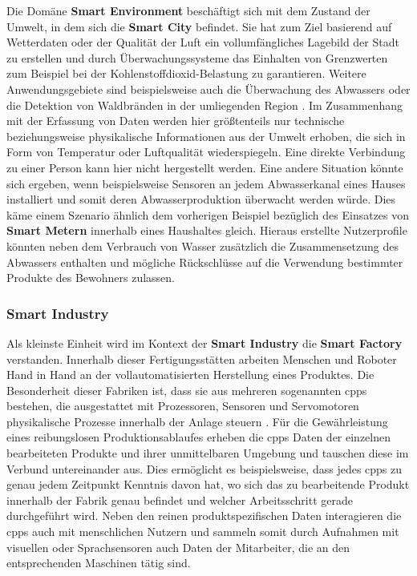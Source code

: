 Die Domäne \textbf{Smart Environment} beschäftigt sich mit dem Zustand der Umwelt, in dem sich die \textbf{Smart City} befindet. Sie hat zum Ziel basierend auf Wetterdaten oder der Qualität der Luft ein vollumfängliches Lagebild der Stadt zu erstellen und durch Überwachungssysteme das Einhalten von Grenzwerten zum Beispiel bei der Kohlenstoffdioxid-Belastung zu garantieren. 
Weitere Anwendungsgebiete sind beispielsweise auch die Überwachung des Abwassers oder die Detektion von Waldbränden in der umliegenden Region \cite{SecPrivSmartCity2021}. Im Zusammenhang mit der Erfassung von Daten werden hier größtenteils nur technische beziehungsweise physikalische Informationen aus der Umwelt erhoben, die sich in Form von Temperatur oder Luftqualität wiederspiegeln. 
Eine direkte Verbindung zu einer Person kann hier nicht hergestellt werden. Eine andere Situation könnte sich ergeben, wenn beispielsweise Sensoren an jedem Abwasserkanal eines Hauses installiert und somit deren Abwasserproduktion überwacht werden würde. 
Dies käme einem Szenario ähnlich dem vorherigen Beispiel bezüglich des Einsatzes von \textbf{Smart Metern} innerhalb eines Haushaltes gleich. Hieraus erstellte Nutzerprofile könnten neben dem Verbrauch von Wasser zusätzlich die Zusammensetzung des Abwassers enthalten und mögliche Rückschlüsse auf die Verwendung bestimmter Produkte des Bewohners zulassen.

\subsubsection{Smart Industry}
\label{sec:Analyse der Datenerhebung:ssec:Smart City:sssec:Smart Industry}

Als kleinste Einheit wird im Kontext der \textbf{Smart Industry} die \textbf{Smart Factory} verstanden. Innerhalb dieser Fertigungsstätten arbeiten Menschen und Roboter Hand in Hand an der vollautomatisierten Herstellung eines Produktes. Die Besonderheit dieser Fabriken ist, dass sie aus mehreren sogenannten \ac{cpps} bestehen, die ausgestattet mit Prozessoren, Sensoren und Servomotoren physikalische Prozesse innerhalb der Anlage steuern \cite{Sadeghi2015}. Für die Gewährleistung eines reibungslosen Produktionsablaufes erheben die \ac{cpps} Daten der einzelnen bearbeiteten Produkte und ihrer unmittelbaren Umgebung und tauschen diese im Verbund untereinander aus. Dies ermöglicht es beispielsweise, dass jedes \ac{cpps} zu genau jedem Zeitpunkt Kenntnis davon hat, wo sich das zu bearbeitende Produkt innerhalb der Fabrik genau befindet und welcher Arbeitsschritt gerade durchgeführt wird. Neben den reinen produktspezifischen Daten interagieren die \ac{cpps} auch mit menschlichen Nutzern und sammeln somit durch Aufnahmen mit visuellen oder Sprachsensoren auch Daten der Mitarbeiter, die an den entsprechenden Maschinen tätig sind.


